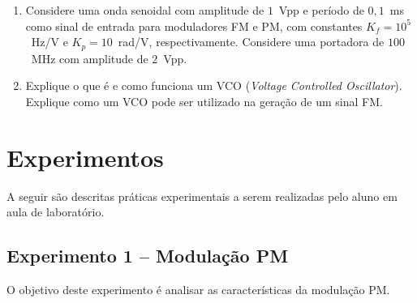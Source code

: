 \documentclass[12pt,addpoints]{exam}
\begin{document}
\begin{enumerate}
    \item Considere uma onda senoidal com amplitude de $1$~Vpp e período de $0,1$~ms como sinal de entrada para moduladores FM e PM, com constantes $K_f = 10^5$~Hz/V e $K_{p} = 10$~rad/V, respectivamente. Considere uma portadora de $100$~MHz com amplitude de $2$~Vpp.
    \item Explique o que é e como funciona um VCO (\textit{Voltage Controlled Oscillator}). Explique como um VCO pode ser utilizado na geração de um sinal FM.
\end{enumerate}

\section{Experimentos}

A seguir são descritas práticas experimentais a serem realizadas pelo aluno em aula de laboratório. 

\subsection{Experimento 1 -- Modulação PM}

O objetivo deste experimento é analisar as características da modulação PM.
\end{document}
